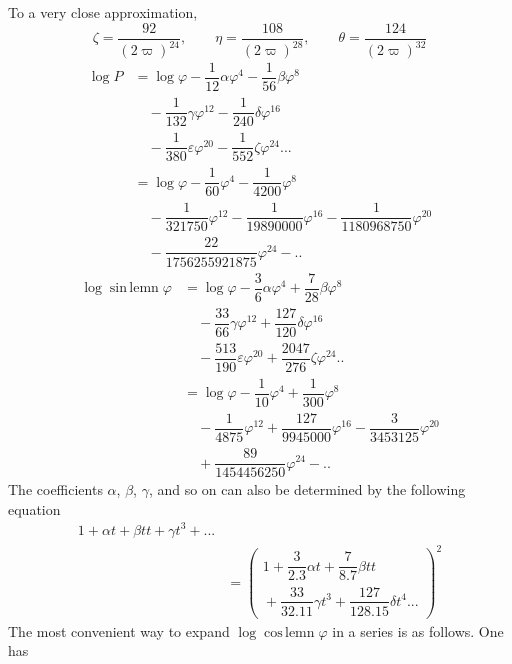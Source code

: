 To a very close approximation,
\[
\zeta=\dfrac{92}{(2\varpi)^{24}},\qquad
\eta=\dfrac{108}{(2\varpi)^{28}},\qquad
\theta=\dfrac{124}{(2\varpi)^{32}}
\]
\[
\begin{aligned}
\log P&=\log\varphi-\dfrac1{12}\alpha\varphi^4-\dfrac1{56}\beta\varphi^8
\\[6pt]&\quad{}-\dfrac1{132}\gamma\varphi^{12}-\dfrac1{240}\delta\varphi^{16}
\\[6pt]&\quad{}-\dfrac1{380}\varepsilon\varphi^{20}-\dfrac1{552}\zeta\varphi^{24}\mathord{.}\mathord{.}\mathord{.}\\[6pt]
&=\log\varphi-\dfrac1{60}\varphi^4-\dfrac1{4200}\varphi^8
\\[6pt]&\quad{}-\dfrac1{321750}\varphi^{12}-\dfrac1{19890000}\varphi^{16}
-\dfrac1{1180968750}\varphi^{20}\\[6pt]
&\quad-\dfrac{22}{1756255921875}\varphi^{24}-\mathord{.}\mathord{.}
\end{aligned}
\]
\[
\begin{aligned}
\log\operatorname{sin\,lemn}\varphi
&=\log\varphi-\dfrac36\alpha\varphi^4+\dfrac7{28}\beta\varphi^8
\\[6pt]&\quad{}-\dfrac{33}{66}\gamma\varphi^{12}+\dfrac{127}{120}\delta\varphi^{16}
\\[6pt]&\quad{}-\dfrac{513}{190}\varepsilon\varphi^{20}+\dfrac{2047}{276}\zeta\varphi^{24}\mathord{.}\mathord{.}\\[6pt]
&=\log\varphi-\dfrac1{10}\varphi^4+\dfrac1{300}\varphi^8
\\[6pt]&\quad{}-\dfrac1{4875}\varphi^{12}+\dfrac{127}{9945000}\varphi^{16}
-\dfrac3{3453125}\varphi^{20}\\[6pt]
&\quad+\dfrac{89}{1454456250}\varphi^{24}-\mathord{.}\mathord{.}
\end{aligned}
\]
The coefficients $\alpha$, $\beta$, $\gamma$, and so on can also be determined by the following equation
\[
\begin{aligned}1+\alpha t+\beta tt+\gamma t^3+\mathord{.}\mathord{.}\mathord{.}
\\[6pt]&=\left(\begin{gathered}1+\dfrac3{2.3}\alpha t+\dfrac7{8.7}\beta tt
\\[4pt]{}+\dfrac{33}{32.11}\gamma t^3+\dfrac{127}{128.15}\delta t^4\mathord{.}\mathord{.}\mathord{.}\end{gathered}\right)^2\end{aligned}
\]
The most convenient way to expand $\log\operatorname{cos\,lemn}\varphi$ in a series is as follows. One has
